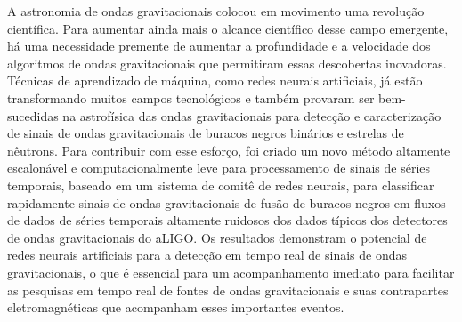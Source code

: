 A astronomia de ondas gravitacionais colocou em movimento uma revolução científica. Para aumentar ainda mais o alcance científico desse campo emergente, há uma necessidade premente de aumentar a profundidade e a velocidade dos algoritmos de ondas gravitacionais que permitiram essas descobertas inovadoras. Técnicas de aprendizado de máquina, como redes neurais artificiais, já estão transformando muitos campos tecnológicos e também provaram ser bem-sucedidas na astrofísica das ondas gravitacionais para detecção e caracterização de sinais de ondas gravitacionais de buracos negros binários e estrelas de nêutrons. Para contribuir com esse esforço, foi criado um novo método altamente escalonável e computacionalmente leve para processamento de sinais de séries temporais, baseado em um sistema de comitê de redes neurais, para classificar rapidamente sinais de ondas gravitacionais de fusão de buracos negros em fluxos de dados de séries temporais altamente ruidosos dos dados típicos dos detectores de ondas gravitacionais do aLIGO. Os resultados demonstram o potencial de redes neurais artificiais para a detecção em tempo real de sinais de ondas gravitacionais, o que é essencial para um acompanhamento imediato para facilitar as pesquisas em tempo real de fontes de ondas gravitacionais e suas contrapartes eletromagnéticas que acompanham esses importantes eventos.

